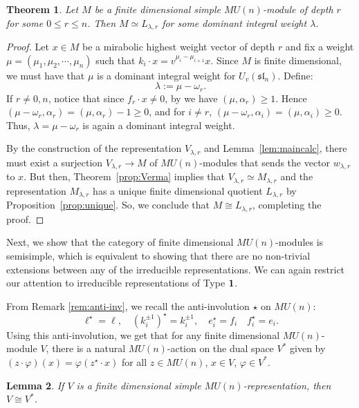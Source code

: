 \documentclass{amsart}
\numberwithin{equation}{section}
\theoremstyle{theorem}
\newtheorem{theorem}{Theorem}[section]
\newtheorem{lemma}[theorem]{Lemma}
\theoremstyle{definition}
\newcommand{\sll}{\mathfrak{sl}}
\newcommand{\uvsln}{U_v(\sll_n)}
\begin{document}
\begin{theorem} \label{thm:class}
Let $M$ be a finite dimensional simple $MU(n)$-module of depth $r$ for some $0\leq r\leq n$. Then $M\simeq L_{\lambda,r}$ for some dominant integral weight $\lambda$.
\end{theorem}
\begin{proof}
Let $x\in M$ be a mirabolic highest weight vector of depth $r$ and fix a weight $\mu=(\mu_1,\mu_2,\cdots,\mu_{n})$ such that $k_i\cdot x = v^{\mu_i-\mu_{i+1}}x.$ Since $M$ is finite dimensional, we must have that $\mu$ is a dominant integral weight for $\uvsln$. Define:
\[\lambda:=\mu - \omega_r.\]
If $r\neq0,n$, notice that since $f_r\cdot x\neq 0$, by \cite[Lemma 5.4(b)]{J} we have $(\mu,\alpha_r)\geq 1$. Hence $(\mu-\omega_r,\alpha_r)=(\mu,\alpha_r)-1\geq 0$, and for $i\neq r$, $(\mu-\omega_r,\alpha_i)=(\mu,\alpha_i)\geq 0$. Thus, $\lambda=\mu-\omega_r$ is again a dominant integral weight.

By the construction of the representation $V_{\lambda,r}$ and Lemma~\ref{lem:maincalc}, there must exist a surjection $V_{\lambda,r}\to M$ of $MU(n)$-modules that sends the vector $w_{\lambda, r}$ to $x$. But then, Theorem~\ref{prop:Verma} implies that $V_{\lambda,r}\simeq M_{\lambda, r}$ and the representation $M_{\lambda,r}$ has a unique finite dimensional quotient $L_{\lambda, r}$ by Proposition~\ref{prop:unique}. So, we conclude that $M\cong L_{\lambda,r}$, completing the proof.
\end{proof}


Next, we show that the category of finite dimensional $MU(n)$-modules is semisimple, which %
is equivalent to showing that there are no non-trivial extensions %
between any of the irreducible representations. We can again restrict our attention to irreducible representations of Type $\bold{1}$. 


From Remark \ref{rem:anti-inv}, we recall the anti-involution $\star$ on $MU(n)$:
\[\ell^\star=\ell,\quad (k_i^{\pm 1})^\star=k_i^{\pm 1},\quad e_i^\star=f_i\quad f_i^\star=e_i.\]
Using this anti-involution, we get that for any finite dimensional $MU(n)$-module $V$, there is a natural $MU(n)$-action on the dual space $V^*$ given by $(z\cdot \varphi)(x)=\varphi(z^\star\cdot x)$ for all $z\in MU(n)$, $x\in V$, $\varphi\in V^*$.

\begin{lemma}
If $V$ is a finite dimensional simple $MU(n)$-representation, then $V\cong V^*$.
\end{lemma}
\end{document}
